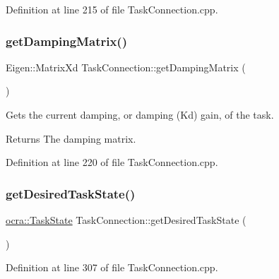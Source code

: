 Definition at line 215 of file Task\+Connection.\+cpp.

\hypertarget{classocra__recipes_1_1TaskConnection_a4176118231f2c5e17e4f749999c9456e}{}\label{classocra__recipes_1_1TaskConnection_a4176118231f2c5e17e4f749999c9456e} 
\subsubsection{\texorpdfstring{get\+Damping\+Matrix()}{getDampingMatrix()}}
{\footnotesize\ttfamily Eigen\+::\+Matrix\+Xd Task\+Connection\+::get\+Damping\+Matrix (\begin{DoxyParamCaption}{ }\end{DoxyParamCaption})}

Gets the current damping, or damping (Kd) gain, of the task.

\begin{DoxyReturn}{Returns}
The damping matrix. 
\end{DoxyReturn}


Definition at line 220 of file Task\+Connection.\+cpp.

\hypertarget{classocra__recipes_1_1TaskConnection_a655f96a4c535179184edf67a961776e7}{}\label{classocra__recipes_1_1TaskConnection_a655f96a4c535179184edf67a961776e7} 
\subsubsection{\texorpdfstring{get\+Desired\+Task\+State()}{getDesiredTaskState()}}
{\footnotesize\ttfamily \hyperlink{classocra_1_1TaskState}{ocra\+::\+Task\+State} Task\+Connection\+::get\+Desired\+Task\+State (\begin{DoxyParamCaption}{ }\end{DoxyParamCaption})}



Definition at line 307 of file Task\+Connection.\+cpp.

\hypertarget{classocra__recipes_1_1TaskConnection_a9898d85644f690d4b0e5d5a2c8338d63}{}\label{classocra__recipes_1_1TaskConnection_a9898d85644f690d4b0e5d5a2c8338d63} 
